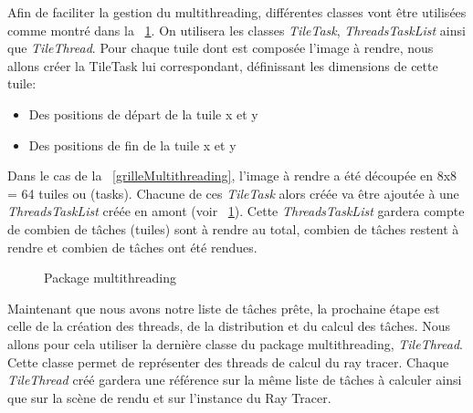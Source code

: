 \documentclass[11pt]{article}
\begin{document}
Afin de faciliter la gestion du multithreading, différentes classes vont être utilisées comme montré dans la \figurename\ \ref{packageMultithreading}. On utilisera les classes \textit{TileTask}, \textit{ThreadsTaskList} ainsi que \textit{TileThread}. Pour chaque tuile dont est composée l'image à rendre, nous allons créer la TileTask lui correspondant, définissant les dimensions de cette tuile:
\begin{itemize}
	\item {Des positions de départ de la tuile x et y}
	\item {Des positions de fin de la tuile x et y}
\end{itemize}
Dans le cas de la \figurename\ \ref{grilleMultithreading}, l'image à rendre a été découpée en 8x8 = 64 tuiles ou (tasks). Chacune de ces \textit{TileTask} alors créée va être ajoutée à une \textit{ThreadsTaskList} créée en amont (voir \figurename\ \ref{packageMultithreading}). Cette \textit{ThreadsTaskList} gardera compte de combien de tâches (tuiles) sont à rendre au total, combien de tâches restent à rendre et combien de tâches ont été rendues.

\begin{figure}[h!]

	\caption{Package multithreading}
	\label{packageMultithreading}
\end{figure}
\FloatBarrier

Maintenant que nous avons notre liste de tâches prête, la prochaine étape est celle de la création des threads, de la distribution et du calcul des tâches. Nous allons pour cela utiliser la dernière classe du package multithreading, \textit{TileThread}. Cette classe permet de représenter des threads de calcul du ray tracer. Chaque \textit{TileThread} créé gardera une référence sur la même liste de tâches à calculer ainsi que sur la scène de rendu et sur l'instance du Ray Tracer.
\end{document}
